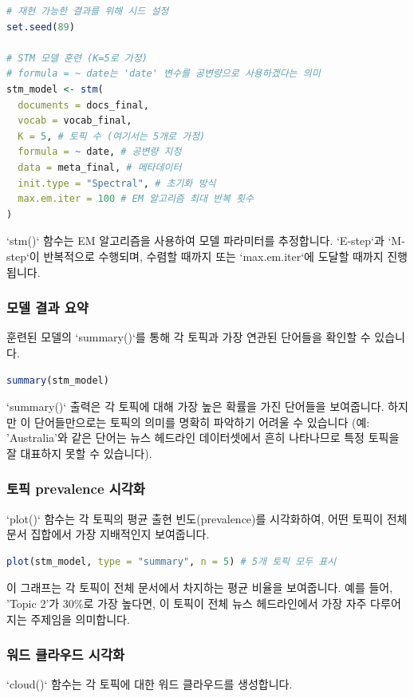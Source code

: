 \documentclass[11pt,a4paper]{article}
\begin{document}
\begin{lstlisting}[language=R, caption={STM 모델 훈련}, label={lst:run_stm}]
# 재현 가능한 결과를 위해 시드 설정
set.seed(89)

# STM 모델 훈련 (K=5로 가정)
# formula = ~ date는 'date' 변수를 공변량으로 사용하겠다는 의미
stm_model <- stm(
  documents = docs_final,
  vocab = vocab_final,
  K = 5, # 토픽 수 (여기서는 5개로 가정)
  formula = ~ date, # 공변량 지정
  data = meta_final, # 메타데이터
  init.type = "Spectral", # 초기화 방식
  max.em.iter = 100 # EM 알고리즘 최대 반복 횟수
)
\end{lstlisting}
`stm()` 함수는 EM 알고리즘을 사용하여 모델 파라미터를 추정합니다. `E-step`과 `M-step`이 반복적으로 수행되며, 수렴할 때까지 또는 `max.em.iter`에 도달할 때까지 진행됩니다.

\subsubsection{모델 결과 요약}
훈련된 모델의 `summary()`를 통해 각 토픽과 가장 연관된 단어들을 확인할 수 있습니다.

\begin{lstlisting}[language=R, caption={STM 모델 요약}, label={lst:summary_stm}]
summary(stm_model)
\end{lstlisting}
`summary()` 출력은 각 토픽에 대해 가장 높은 확률을 가진 단어들을 보여줍니다. 하지만 이 단어들만으로는 토픽의 의미를 명확히 파악하기 어려울 수 있습니다 (예: 'Australia'와 같은 단어는 뉴스 헤드라인 데이터셋에서 흔히 나타나므로 특정 토픽을 잘 대표하지 못할 수 있습니다).

\subsubsection{토픽 prevalence 시각화}
`plot()` 함수는 각 토픽의 평균 출현 빈도(prevalence)를 시각화하여, 어떤 토픽이 전체 문서 집합에서 가장 지배적인지 보여줍니다.

\begin{lstlisting}[language=R, caption={토픽 prevalence 시각화}, label={lst:plot_prevalence}]
plot(stm_model, type = "summary", n = 5) # 5개 토픽 모두 표시
\end{lstlisting}
이 그래프는 각 토픽이 전체 문서에서 차지하는 평균 비율을 보여줍니다. 예를 들어, 'Topic 2'가 30\%로 가장 높다면, 이 토픽이 전체 뉴스 헤드라인에서 가장 자주 다루어지는 주제임을 의미합니다.

\subsubsection{워드 클라우드 시각화}
`cloud()` 함수는 각 토픽에 대한 워드 클라우드를 생성합니다.
\end{document}
